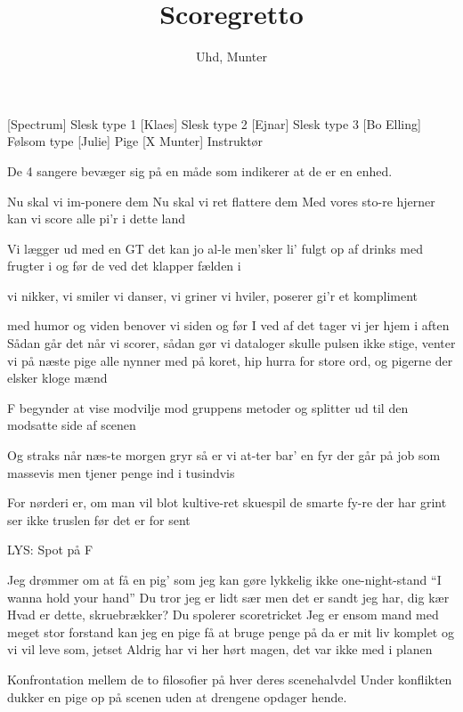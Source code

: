 \documentclass[a4paper,11pt]{article}
\title{Scoregretto}
\author{Uhd, Munter}
\begin{document}
 \maketitle

\begin{roles}
	[Spectrum] Slesk type 1
	[Klaes] Slesk type 2
	[Ejnar] Slesk type 3
	[Bo Elling] Følsom type
	[Julie] Pige
	[X Munter] Instruktør
\end{roles}

\scene De 4 sangere bevæger sig på en måde som indikerer at de er en enhed.

\begin{song}

 Nu skal vi im-ponere dem
	Nu skal vi ret flattere dem
	Med vores sto-re hjerner kan
	vi score alle pi'r i dette land

	Vi lægger ud med en GT
	det kan jo al-le men'sker li'
	fulgt op af drinks med frugter i
	og før de ved det klapper fælden i

 vi nikker, vi smiler
	vi danser, vi griner
	vi hviler, poserer
	gi'r et kompliment

	med humor og viden
	benover vi siden
	og før I ved af det
	tager vi jer hjem i aften
	Sådan går det når vi scorer, sådan gør vi dataloger
	skulle pulsen ikke stige, venter vi på næste pige
	alle nynner med på koret, hip hurra for store ord, og
	pigerne der elsker kloge mænd

\scene F begynder at vise modvilje mod gruppens metoder og splitter ud til den modsatte side af scenen

 Og straks når næs-te morgen gryr
	så er vi at-ter bar' en fyr
	der går på job som massevis
	men tjener penge ind i tusindvis

	For nørderi er, om man vil
	blot kultive-ret skuespil
	de smarte fy-re der har grint
	ser ikke truslen før det er for sent

\scene LYS: Spot på F

 Jeg drømmer om at få en pig'
	som jeg kan gøre lykkelig
	ikke one-night-stand
	``I wanna hold your hand''
	Du tror jeg er lidt sær
	men det er sandt jeg har, dig kær
 Hvad er dette, skruebrækker? Du spolerer scoretricket
 Jeg er ensom mand
	med meget stor forstand
	kan jeg en pige få
	at bruge penge på
	da er mit liv komplet
	og vi vil leve som, jetset
 Aldrig har vi her hørt magen, det var ikke med i planen

\scene Konfrontation mellem de to filosofier på hver deres scenehalvdel
\scene Under konflikten dukker en pige op på scenen uden at drengene opdager hende.


\end{song}
\end{document}
